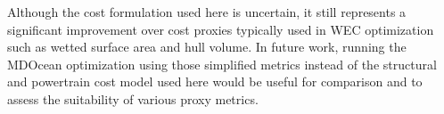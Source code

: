 Although the cost formulation used here is uncertain, it still represents a significant improvement over cost proxies typically used in WEC optimization such as wetted surface area and hull volume.
In future work, running the MDOcean optimization using those simplified metrics instead of the structural and powertrain cost model used here would be useful for comparison and to assess the suitability of various proxy metrics. 




\newcommand{\speedups}{
    Examples of changes that would make it even faster: 
    1) use gradient sparsity pattern to get rid of FD evaluations, or get rid of FD altogether by using matlab automatic differentiation 
    2) make multi body code simpler more like single body
}

